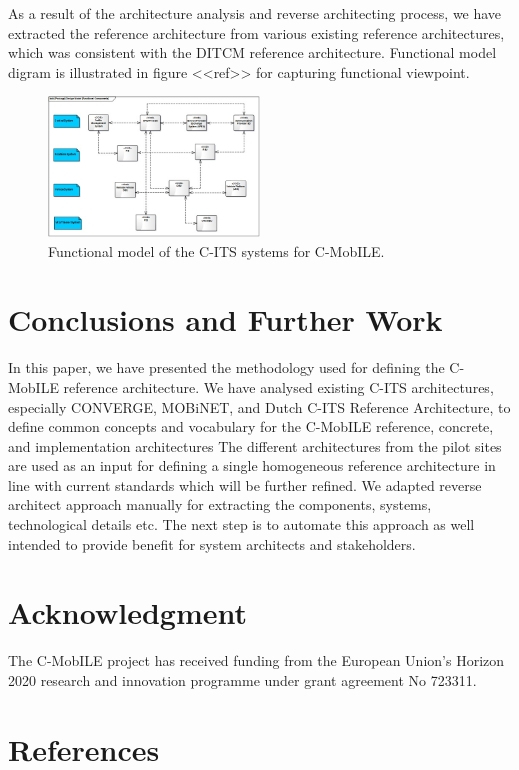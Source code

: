 \documentclass[conference]{IEEEtran}
\begin{document}
As a result of the architecture analysis and reverse architecting process, we have extracted the reference architecture from various existing reference architectures, which was consistent with the DITCM reference architecture. Functional model digram is illustrated in figure <<ref>> for capturing functional viewpoint.
\begin{figure}[ht]
	\includegraphics[width=0.5\textwidth]{functional_vp}
	\caption{Functional model of the C-ITS systems for C-MobILE.}
	\label{fig}
\end{figure}
 

\section{Conclusions and Further Work}

In this paper, we have presented the methodology used for defining the C-MobILE reference architecture. We have analysed existing C-ITS architectures, especially CONVERGE, MOBiNET, and Dutch C-ITS Reference Architecture, to define common concepts and vocabulary for the C-MobILE reference, concrete, and implementation architectures The different architectures from the pilot sites are used as an input for defining a single homogeneous reference architecture in line with current standards which will be further refined. We adapted reverse architect approach manually for extracting the components, systems, technological details etc. The next step is to automate this approach as well intended to provide benefit for system architects and stakeholders. 


\section*{Acknowledgment}

The C-MobILE project has received funding from the European Union’s Horizon 2020 research and innovation programme under grant agreement No 723311.

\section*{References}
\end{document}
